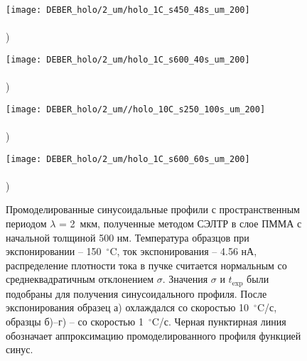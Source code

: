 \begin{figure}[t!]
	\begin{minipage}{0.48\textwidth}
			\texttt{[image: DEBER\_holo/2\_um/holo\_1C\_s450\_48s\_um\_200]} \\
			\vspace{-13em} \\ ) \\ \vspace{13em}
		\end{minipage}
	\begin{minipage}{0.48\textwidth}
			\texttt{[image: DEBER\_holo/2\_um/holo\_1C\_s600\_40s\_um\_200]} \\
			\vspace{-13em} \\ ) \\ \vspace{13em}
		\end{minipage}
	
	\vspace{-3em}
	
	\begin{minipage}{0.48\textwidth}
			\texttt{[image: DEBER\_holo/2\_um//holo\_10C\_s250\_100s\_um\_200]} \\
			\vspace{-13em} \\ ) \\ \vspace{13em}
		\end{minipage}
	\begin{minipage}{0.48\textwidth}
			\texttt{[image: DEBER\_holo/2\_um/holo\_1C\_s600\_60s\_um\_200]} \\
			\vspace{-13em} \\ ) \\ \vspace{13em}
		\end{minipage}
	\vspace{-3em}
	\caption{Промоделированные синусоидальные профили с пространственным периодом $\lambda$ = 2~мкм, полученные методом СЭЛТР в слое ПММА с начальной толщиной 500 нм. Температура образцов при экспонировании -- 150~$^\circ$C, ток экспонирования -- 4.56 нА, распределение плотности тока в пучке считается нормальным со среднеквадратичным отклонением $\sigma$. Значения $\sigma$ и $t_\mathrm{exp}$ были подобраны для получения синусоидального профиля. После экспонирования образец а) охлаждался со скоростью 10~$^\circ$C/с, образцы б)--г) -- со скоростью 1~$^\circ$C/с. Черная пунктирная линия обозначает аппроксимацию промоделированного профиля функцией синус.}
	\label{fig:DEBER_holo_2um}
\end{figure}


